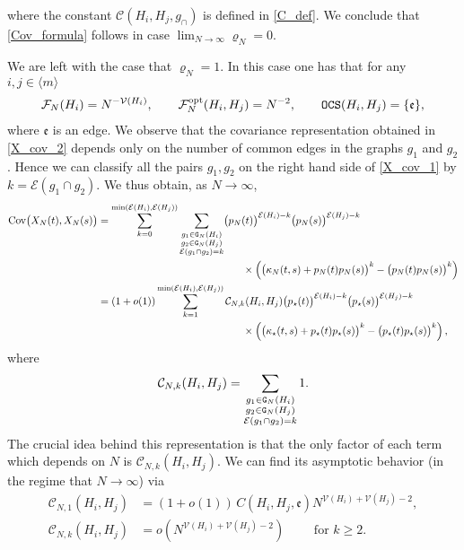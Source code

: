 \documentclass[11pt,reqno]{amsart}
\numberwithin{equation}{section}
\newcommand{\sprod}[1]{\langle#1\rangle}
\begin{document}
where the constant $\mathcal{C}({H}_i,{H}_j,g_{\cap})$ is defined in \eqref{C_def}. We conclude that \eqref{Cov_formula} follows in case $\lim_{N\to\infty}\varrho_N = 0$. 


We are left with the case that $\varrho_N=1$. In this case one has that for any $i,j\in\sprod{m}$
\begin{align*}
    \mathcal{F}_N({H}_i) = N^{-\mathcal{V}({H}_i)},\qquad \mathcal{F}_N^{\rm{opt}}({H}_i,{H}_j) = N^{-2}, \qquad {\tt OCS}({H}_i,{H}_j) = \{\mathfrak e\},
\end{align*}
where $\mathfrak{e}$ is an edge. We observe that the covariance representation obtained in \eqref{X_cov_2} depends only on the number of common edges in the graphs $g_1$ and $g_2$. Hence we can classify all the pairs $g_1,g_2$ on the right hand side of \eqref{X_cov_1} by $k=\mathcal{E}(g_1\cap g_2)$. We thus obtain, {as $N\to\infty$},
\begin{align*}
    \operatorname{Cov}\bigl(X_N(t), X_N(s)\bigr)&=\sum_{k=0}^{\min(\mathcal{E}({H}_i),\mathcal{E}({H}_j))}\sum_{\substack{g_1\in{\tt G}_N({H}_i) \\ g_2\in{\tt G}_N({H}_j) \\ \mathcal{E}(g_1\cap g_2)=k}}\bigl(p_N(t)\bigr)^{\mathcal{E}({H}_i) - k}\bigl(p_N(s)\bigr)^{\mathcal{E}({H}_j) - k}\\
    &\qquad\qquad\qquad\qquad\qquad\qquad\qquad\times\left( \bigl(\kappa_N(t,s) + p_N(t)p_N(s)\bigr)^{k} - \bigl(p_N(t)p_N(s)\bigr)^{k}\right)\\
    &=(1+o(1))\sum_{k=1}^{\min(\mathcal{E}({H}_i),\mathcal{E}({H}_j))}\mathcal{C}_{N,k}({H}_i,{H}_j)\bigl(p_{\star}(t)\bigr)^{\mathcal{E}({H}_i) - k}\bigl(p_{\star}(s)\bigr)^{\mathcal{E}({H}_j) - k}\\
    &\qquad\qquad\qquad\qquad\qquad\qquad\qquad\times\left( \bigl(\kappa_{\star}(t,s) + p_{\star}(t)p_{\star}(s)\bigr)^{k} - \bigl(p_{\star}(t)p_{\star}(s)\bigr)^k\right),
\end{align*}
{where}
\begin{align*}
    \mathcal{C}_{N,k}({H}_i,{H}_j) = \sum_{\substack{g_1\in{\tt G}_N({H}_i) \\ g_2\in{\tt G}_N({H}_j) \\ \mathcal{E}(g_1\cap g_2)=k}} 1.
\end{align*}
The crucial idea behind this representation is that the only factor of each term which depends on $N$ is $\mathcal{C}_{N,k}({H}_i,{H}_j)$. We can find its asymptotic behavior (in the regime that $N\to\infty$) via
\begin{align*}
    \mathcal{C}_{N,1}({H}_i,{H}_j) &= (1+o(1)) \,C({H}_i,{H}_j,\mathfrak{e}) N^{\mathcal{V}({H}_i) + \mathcal{V}({H}_j) - 2},\\
    \mathcal{C}_{N,k}({H}_i,{H}_j) &= o(N^{\mathcal{V}({H}_i) + \mathcal{V}({H}_j) - 2})\qquad \text { for } k\geqslant 2.
\end{align*}
\end{document}
